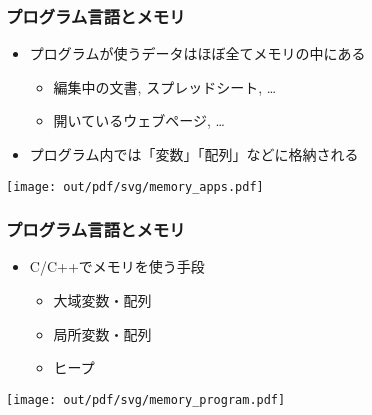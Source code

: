 \documentclass[12pt,dvipdfmx]{beamer}
\begin{document}
\begin{frame}[fragile]
  \frametitle{プログラム言語とメモリ}
  \begin{itemize}
  \item プログラムが使うデータはほぼ全てメモリの中にある
    \begin{itemize}
    \item 編集中の文書, スプレッドシート, \ldots
    \item 開いているウェブページ, \ldots
    \end{itemize}

  \item プログラム内では「変数」「配列」などに格納される

  \end{itemize}
  \begin{center}
    \texttt{[image: out/pdf/svg/memory\_apps.pdf]}
  \end{center}
\end{frame}
    
\begin{frame}
  \frametitle{プログラム言語とメモリ}
  \begin{itemize}
  \item C/C++でメモリを使う手段
    \begin{itemize}
    \item 大域変数・配列
    \item 局所変数・配列
    \item ヒープ
    \end{itemize}
  \end{itemize}

  \begin{center}
    \texttt{[image: out/pdf/svg/memory\_program.pdf]}
  \end{center}
\end{frame}
\end{document}
